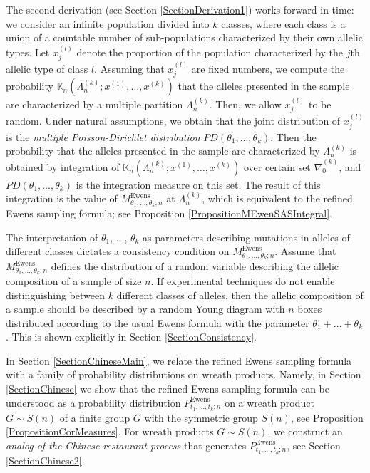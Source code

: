 \documentclass[12pt]{amsart}
\theoremstyle{definition}
\numberwithin{equation}{section}
\DeclareMathOperator{\Ewens}{Ewens}
\begin{document}
The second derivation (see Section \ref{SectionDerivation1}) works forward in time:
we consider an infinite population divided into $k$ classes, where each class is a union of a countable number of sub-populations characterized by their own
allelic types. Let $x_j^{(l)}$ denote the proportion of the population characterized by the $j$th allelic type of class $l$. Assuming that
$x_j^{(l)}$ are fixed numbers, we compute the probability
$\mathbb{K}_n\left(\Lambda_n^{(k)};x^{(1)},\ldots,x^{(k)}\right)$ that the alleles presented in the sample are characterized by a multiple partition $\Lambda_n^{(k)}$. Then, we allow $x_j^{(l)}$ to be random.
Under natural assumptions, we obtain that the joint distribution of $x_j^{(l)}$ is the \textit{multiple Poisson-Dirichlet distribution}
$PD\left(\theta_1,\ldots,\theta_k\right)$.
Then the probability that the alleles presented in the sample are characterized by $\Lambda_n^{(k)}$ is obtained by integration of
$\mathbb{K}_n\left(\Lambda_n^{(k)};x^{(1)},\ldots,x^{(k)}\right)$
over certain set $\overline{\nabla}_0^{(k)}$, and $PD\left(\theta_1,\ldots,\theta_k\right)$ is the integration measure
on this set. The result of this integration is the value of
$M_{\theta_1,\ldots,\theta_k; n}^{\Ewens}$ at $\Lambda_n^{(k)}$, which is equivalent to the refined Ewens sampling formula; see Proposition
\ref{PropositionMEwenSASIntegral}.

The interpretation of $\theta_1$, $\ldots$, $\theta_k$ as parameters describing mutations in alleles of different classes dictates a consistency condition on
$M_{\theta_1,\ldots,\theta_k;n}^{\Ewens}$.  Assume that $M_{\theta_1,\ldots,\theta_k;n}^{\Ewens}$ defines the distribution of a random variable describing the allelic composition of a sample of size $n$.
If experimental techniques do not enable distinguishing between $k$ different classes of alleles, then the allelic composition of a sample
should be described by a random Young diagram with $n$ boxes distributed according to the usual Ewens formula with the parameter $\theta_1+\ldots+\theta_k$. This is shown explicitly in Section \ref{SectionConsistency}.

In Section \ref{SectionChineseMain}, we relate the refined Ewens sampling formula with a family of probability distributions on wreath products. Namely,
in Section \ref{SectionChinese} we show that the refined Ewens sampling formula can be understood as a probability distribution
$P_{t_1,\ldots,t_k;n}^{\Ewens}$ on a wreath product
$G\sim S(n)$ of a finite group $G$ with the symmetric group $S(n)$, see Proposition \ref{PropositionCorMeasures}. For wreath products $G\sim S(n)$, we construct an \textit{ analog of the Chinese
restaurant process} \cite{Aldous} that generates $P_{t_1,\ldots,t_k;n}^{\Ewens}$, see Section \ref{SectionChinese2}.
\end{document}
